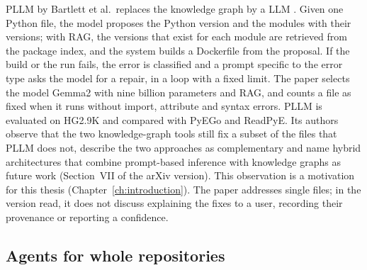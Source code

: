 PLLM by Bartlett et al.\ replaces the knowledge graph by a \ac{LLM} \cite{bartlett2025lastdependency}. Given one Python file, the model proposes the Python version and the modules with their versions; with \ac{RAG}, the versions that exist for each module are retrieved from the package index, and the system builds a Dockerfile from the proposal. If the build or the run fails, the error is classified and a prompt specific to the error type asks the model for a repair, in a loop with a fixed limit. The paper selects the model Gemma2 with nine billion parameters and \ac{RAG}, and counts a file as fixed when it runs without import, attribute and syntax errors. PLLM is evaluated on HG2.9K and compared with PyEGo and ReadPyE. Its authors observe that the two knowledge-graph tools still fix a subset of the files that PLLM does not, describe the two approaches as complementary and name hybrid architectures that combine prompt-based inference with knowledge graphs as future work (Section~VII of the arXiv version). This observation is a motivation for this thesis (Chapter~\ref{ch:introduction}). The paper addresses single files; in the version read, it does not discuss explaining the fixes to a user, recording their provenance or reporting a confidence.%

\subsection{Agents for whole repositories}

